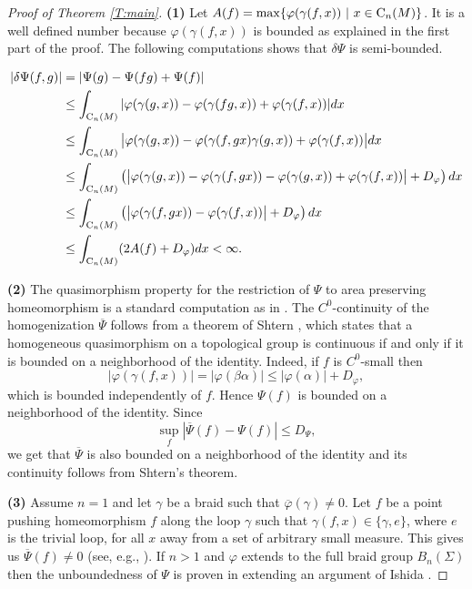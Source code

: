 \documentclass[11pt]{amsart}
\theoremstyle{definition}
\theoremstyle{remark}
\numberwithin{equation}{section}
\numberwithin{figure}{section}
\begin{document}
\begin{proof}[Proof of Theorem \ref{T:main}]
\noindent
{\bf (1)} Let $A(f) = \max\{\varphi(\gamma(f,x))\ |\ x\in {\rm C}_n(M)\}$. It is
a well defined number because $\varphi(\gamma(f,x))$ is bounded as explained in the first part of the proof.
The following computations shows that $\delta\Psi$ is semi-bounded.

\begin{align*}
|\delta\Psi(f,g)|
&=|\Psi(g)-\Psi(fg)+\Psi(f)|\\
&\leq \int_{{\rm C}_n(M)} |\varphi(\gamma(g,x)) -\varphi(\gamma(fg,x)) + \varphi(\gamma(f,x))|dx\\
&\leq \int_{{\rm C}_n(M)} \big |\varphi(\gamma(g,x)) -\varphi(\gamma(f,gx)\gamma(g,x)) + \varphi(\gamma(f,x))\big |dx\\
&\leq \int_{{\rm C}_n(M)} \left(\big |\varphi(\gamma(g,x)) -\varphi(\gamma(f,gx))-\varphi(\gamma(g,x)) + \varphi(\gamma(f,x))\big |+D_{\varphi}\right)dx\\
&\leq \int_{{\rm C}_n(M)} \left(\big | \varphi(\gamma(f,gx))- \varphi(\gamma(f,x))\big |+D_{\varphi}\right)dx\\
&\leq \int_{{\rm C}_n(M)} (2A(f)+D_{\varphi})dx <\infty.
\end{align*}

\noindent
{\bf (2)} The quasimorphism property for the restriction of $\Psi$ to 
area preserving homeomorphism is a standard computation as in \cite{zbMATH05980986}.
The $C^0$-continuity of the homogenization $\overline{\Psi}$ follows
from a theorem of Shtern \cite[Theorem 1]{zbMATH01709147}, which states that a homogeneous
quasimorphism on a topological group is continuous if and only if
it is bounded on a neighborhood of the identity. Indeed, if
$f$ is $C^0$-small then
$$
|\varphi(\gamma(f,x))| = |\varphi(\beta\alpha)| \leq |\varphi(\alpha)|+D_{\varphi},
$$
which is bounded independently of $f$. Hence $\Psi(f)$ is bounded on
a neighborhood of the identity. Since 
$$\sup_{f}|\overline{\Psi}(f)-\Psi(f)|\leq D_{\Psi},$$
we get that $\overline{\Psi}$ is also bounded on a neighborhood of the
identity and its continuity follows from Shtern's theorem.

\noindent
{\bf (3)} Assume $n=1$ and let $\gamma$ be a braid such that 
$\overline{\varphi}(\gamma) \neq 0$. Let $f$ be a point pushing homeomorphism $f$ 
along the loop $\gamma$ such that $\gamma(f,x) \in \{\gamma,e\}$, where $e$ is the trivial 
loop, for all $x$ away from a set of arbitrary small measure. 
This gives us $\overline{\Psi}(f) \neq 0$ (see, e.g., \cite[Theorem 2.5]{zbMATH07159382}). 
If $n>1$ and $\varphi$ extends to the full braid group $B_n(\Sigma)$ then the unboundedness
of $\Psi$ is proven in \cite{zbMATH06490154} extending an argument of
Ishida \cite{zbMATH06596006}.
\end{proof}
\end{document}
